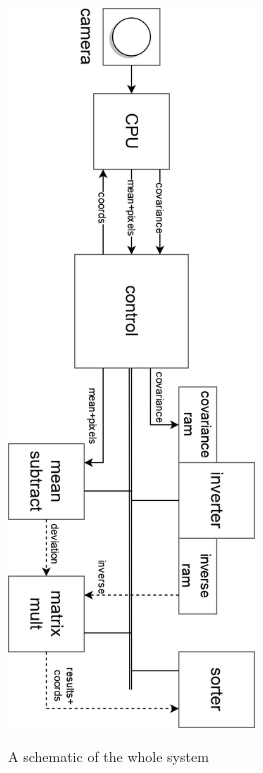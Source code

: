 \begin{figure}
\centering\textbf{
\includegraphics[height=7.5in]{figures/bus.png}}
\caption[A schematic of the top block]{A schematic of the whole system}
  \label{fig:bus}
\end{figure}

%
%
%
%
%
%
%


